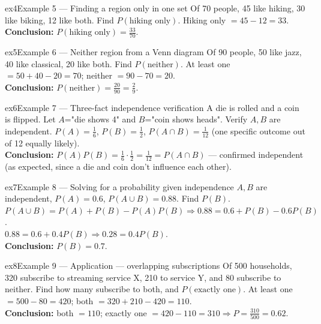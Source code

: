 \documentclass[11pt]{article}
\begin{document}
\begin{example}{ex4}{Example 5 --- Finding a region only in one set}
Of 70 people, 45 like hiking, 30 like biking, 12 like both. Find $P(\text{hiking only})$.\soln
Hiking only $=45-12=33$.\\[3pt]\textbf{Conclusion:} $P(\text{hiking only})=\tfrac{33}{70}$.
\end{example}

\begin{example}{ex5}{Example 6 --- Neither region from a Venn diagram}
Of 90 people, 50 like jazz, 40 like classical, 20 like both. Find $P(\text{neither})$.\soln
At least one $=50+40-20=70$; neither $=90-70=20$.\\[3pt]\textbf{Conclusion:} $P(\text{neither})=\tfrac{20}{90}=\tfrac29$.
\end{example}

\begin{example}{ex6}{Example 7 --- Three-fact independence verification}
A die is rolled and a coin is flipped. Let $A$="die shows 4" and $B$="coin shows heads". Verify $A,B$ are independent.\soln
$P(A)=\tfrac16$, $P(B)=\tfrac12$, $P(A\cap B)=\tfrac1{12}$ (one specific outcome out of 12 equally likely).\\[3pt]\textbf{Conclusion:} $P(A)P(B)=\tfrac16\cdot\tfrac12=\tfrac1{12}=P(A\cap B)$ --- confirmed independent (as expected, since a die and coin don't influence each other).
\end{example}

\begin{example}{ex7}{Example 8 --- Solving for a probability given independence}
$A,B$ are independent, $P(A)=0.6$, $P(A\cup B)=0.88$. Find $P(B)$.\soln
$P(A\cup B)=P(A)+P(B)-P(A)P(B)\Rightarrow0.88=0.6+P(B)-0.6P(B)$.\\[3pt]
$0.88=0.6+0.4P(B)\Rightarrow0.28=0.4P(B)$.\\[3pt]\textbf{Conclusion:} $P(B)=0.7$.
\end{example}

\begin{example}{ex8}{Example 9 --- Application --- overlapping subscriptions}
Of 500 households, 320 subscribe to streaming service X, 210 to service Y, and 80 subscribe to neither. Find how many subscribe to both, and $P(\text{exactly one})$.\soln
At least one $=500-80=420$; both $=320+210-420=110$.\\[3pt]\textbf{Conclusion:} both $=110$; exactly one $=420-110=310\Rightarrow P=\tfrac{310}{500}=0.62$.
\end{example}
\end{document}
